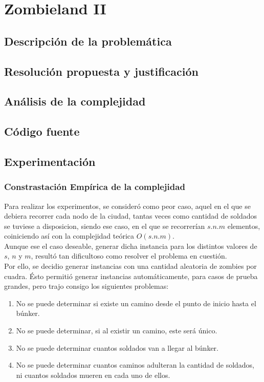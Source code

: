 \section{Zombieland II}
\subsection{Descripci\'on de la problem\'atica}
\subsection{Resoluci\'on propuesta y justificaci\'on}
\subsection{An\'alisis de la complejidad}
\subsection{C\'odigo fuente}
\subsection{Experimentaci\'on}
\subsubsection{Constrastaci\'on Emp\'irica de la complejidad}
Para realizar los experimentos, se consideró como peor caso, aquel en el que se debiera recorrer cada nodo de la ciudad, tantas veces como cantidad de soldados se tuviese a disposicion, siendo ese caso, en el que se recorrerían $s.n.m$ elementos, coiniciendo así con la complejidad teórica $O(s.n.m)$.\\
Aunque ese el caso deseable, generar dicha instancia para los distintos valores de $s$, $n$ y $m$, resultó tan dificultoso como resolver el problema en cuestión.\\
Por ello, se decidio generar instancias con una cantidad aleatoria de zombies por cuadra. Ésto permitió generar instancias automáticamente, para casos de prueba grandes, pero trajo consigo los siguientes problemas:
\begin{enumerate}
	\item No se puede determinar si existe un camino desde el punto de inicio hasta el búnker.
	\item No se puede determinar, si al existir un camino, este será único.
	\item No se puede determinar cuantos soldados van a llegar al búnker.
	\item No se puede determinar cuantos caminos adulteran la cantidad de soldados, ni cuantos soldados mueren en cada uno de ellos.
\end{enumerate}

